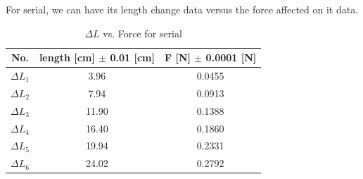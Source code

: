For serial, we can have its length change data versus the force affected on it
data.  

\begin{table}[H]
\centering
\begin{tabular}{|c|c|c|}
\hline
No. & length [cm] $\pm$ 0.01 [cm] & F [N] $\pm$ 0.0001 [N] \\ \hline
$\Delta L_1$ & 3.96  &  0.0455  \\ \hline
$\Delta L_2$ & 7.94  &  0.0913  \\ \hline
$\Delta L_3$ & 11.90 &  0.1388  \\ \hline
$\Delta L_4$ & 16.40 &  0.1860  \\ \hline
$\Delta L_5$ & 19.94 &  0.2331  \\ \hline
$\Delta L_6$ & 24.02 &  0.2792  \\ \hline
\end{tabular}
\caption{$\Delta L$  vs. Force for serial}
\label{ssdf}
\end{table}
